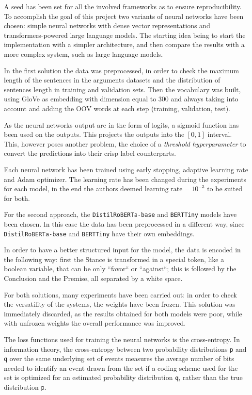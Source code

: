 \documentclass[11pt]{article}
\begin{document}
A seed has been set for all the involved frameworks as to ensure reproducibility.
To accomplish the goal of this project two variants of neural networks have been chosen: simple neural networks with dense vector representations and transformers-powered large language models.
The starting idea being to start the implementation with a simpler architecture, and then compare the results with a more complex system, such as large language models.

In the first solution the data was preprocessed, in order to check the maximum length of the sentences in the arguments datasets and the distribution of sentences length in training and validation sets.
Then the vocabulary was built, using GloVe\cite{Pennington2014} as embedding with dimension equal to 300 and always taking into account and adding the OOV words at each step (training, validation, test).

As the neural networks output are in the form of logits, a sigmoid function has been used on the outputs. This projects the outputs into the $[0,1]$ interval. This, however poses another problem, the choice of a \textit{threshold hyperparameter} to convert the predictions into their crisp label counterparts.

Each neural network has been trained using early stopping, adaptive learning rate and Adam\cite{Kingma2014} optimizer.
The learning rate has been changed during the experiments for each model, in the end the authors deemed $\text{learning rate}=10^{-3}$ to be suited for both.

For the second approach, the \texttt{DistilRoBERTa-base} and \texttt{BERTTiny} models have been chosen.
In this case the data has been preprocessed in a different way, since \texttt{DistilRoBERTa-base} and \texttt{BERTTiny} have their own embeddings.

In order to have a better structured input for the model, the data is encoded in the following way: first the Stance is transformed in a special token, like a boolean variable, that can be only ``favor`` or ``against``; this is followed by the Conclusion and the Premise, all separated by a white space.

For both solutions, many experiments have been carried out: in order to check the versatility of the systems, the weights have been frozen.
This solution was immediately discarded, as the results obtained for both models were poor, while with unfrozen weights the overall performance was improved.

The loss functions used for training the neural networks is the cross-entropy.
In information theory, the cross-entropy between two probability distributions \texttt{p} and \texttt{q} over the same underlying set of events measures the average number of bits needed to identify an event drawn from the set if a coding scheme used for the set is optimized for an estimated probability distribution \texttt{q}, rather than the true distribution \texttt{p}.
\end{document}
